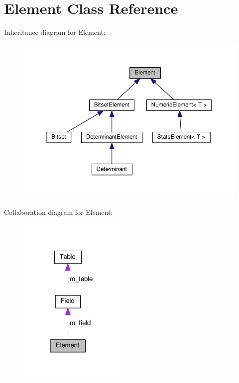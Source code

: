 \hypertarget{classElement}{}\section{Element Class Reference}
\label{classElement}


Inheritance diagram for Element\+:\nopagebreak
\begin{figure}[H]
\begin{center}
\leavevmode
\includegraphics[width=350pt]{classElement__inherit__graph}
\end{center}
\end{figure}


Collaboration diagram for Element\+:\nopagebreak
\begin{figure}[H]
\begin{center}
\leavevmode
\includegraphics[width=145pt]{classElement__coll__graph}
\end{center}
\end{figure}

